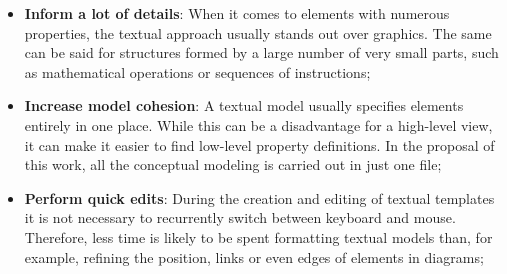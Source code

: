 \begin{itemize}
    \item \textbf{Inform a lot of details}: When it comes to elements with numerous properties, the textual approach usually stands out over graphics.
    The same can be said for structures formed by a large number of very small parts, such as mathematical operations or sequences of instructions;
    \item \textbf{Increase model cohesion}: A textual model usually specifies elements entirely in one place.
    While this can be a disadvantage for a high-level view, it can make it easier to find low-level property definitions.
    In the proposal of this work, all the conceptual modeling is carried out in just one file;
    \item \textbf{Perform quick edits}: During the creation and editing of textual templates it is not necessary to recurrently switch between keyboard and mouse.
    Therefore, less time is likely to be spent formatting textual models than, for example, refining the position, links or even edges of elements in diagrams;

\end{itemize}
